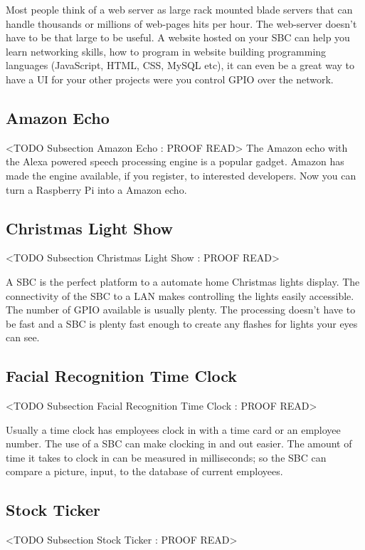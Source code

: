 Most people think of a web server as large rack mounted blade servers that can handle thousands or millions of web-pages hits per hour. The web-server doesn't have to be that large to be useful. A website hosted on your \ac{SBC} can help you learn networking skills, how to program in website building programming languages (JavaScript, \ac{HTML}, \ac{CSS}, MySQL etc), it can even be a great way to have a \ac{UI} for your other projects were you control \ac{GPIO} over the network.

\subsection{Amazon Echo}
	<TODO Subsection Amazon Echo : PROOF READ>
The Amazon echo with the Alexa powered speech processing engine is a popular gadget. Amazon has made the engine available, if you register, to interested developers. Now you can turn a Raspberry Pi into a Amazon echo. 
	
	
\subsection{Christmas Light Show}
	<TODO Subsection Christmas Light Show : PROOF READ>

A \ac{SBC} is the perfect platform to a automate home Christmas lights display. The connectivity of the \ac{SBC} to a \ac{LAN} makes controlling the lights easily accessible. The number of \ac{GPIO} available is usually plenty. The processing doesn't have to be fast and a \ac{SBC} is plenty fast enough to create any flashes for lights your eyes can see. 
	
	
\subsection{Facial Recognition Time Clock}
	<TODO Subsection Facial Recognition Time Clock : PROOF READ>

Usually a time clock has employees clock in with a time card or an employee number. The use of a \ac{SBC} can make clocking in and out easier. The amount of time it takes to clock in can be measured in milliseconds; so the \ac{SBC} can compare a picture, input, to the database of current employees. 
	
\subsection{Stock Ticker}
	<TODO Subsection Stock Ticker : PROOF READ>

